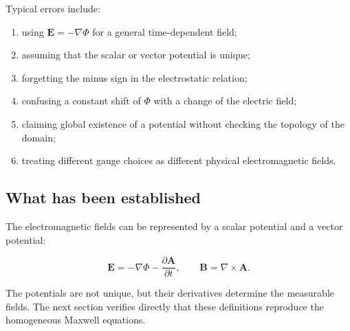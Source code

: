 Typical errors include:

\begin{enumerate}
    \item using \(\mathbf{E}=-\nabla\Phi\) for a general time-dependent field;
    \item assuming that the scalar or vector potential is unique;
    \item forgetting the minus sign in the electrostatic relation;
    \item confusing a constant shift of \(\Phi\) with a change of the electric field;
    \item claiming global existence of a potential without checking the topology of the domain;
    \item treating different gauge choices as different physical electromagnetic fields.
\end{enumerate}

\subsection{What has been established}

The electromagnetic fields can be represented by a scalar potential and a vector potential:

\[
\mathbf{E}
=
-\nabla\Phi
-
\frac{\partial\mathbf{A}}{\partial t},
\qquad
\mathbf{B}
=
\nabla\times\mathbf{A}.
\]

The potentials are not unique, but their derivatives determine the measurable fields. The next section verifies directly that these definitions reproduce the homogeneous Maxwell equations.
